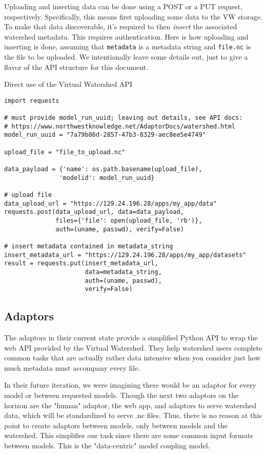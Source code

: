 \documentclass[
11pt, %
a4paper, %
oneside, %
twoside, %
headinclude,footinclude, %
BCOR5mm, %
]{scrartcl}
\begin{document}
Uploading and inserting data can be done using a POST or a PUT request, respectively. Specifically,
this means first uploading some data to the VW storage. To make that data discoverable, 
it's required to then \textit{insert} the associated watershed metadata. This
requires authentication. Here is how uploading and inserting is done, assuming that \texttt{metadata} is a 
metadata string and \texttt{file.nc} is the file to be uploaded. We intentionally leave some details out,
just to give a flavor of the API structure for this document.
\begin{listing}
    \caption{Direct use of the Virtual Watershed API}
\begin{verbatim}
import requests

# must provide model_run_uuid; leaving out details, see API docs:
# https://www.northwestknowledge.net/AdaptorDocs/watershed.html
model_run_uuid = "7a79b86d-2857-47b3-8329-aec8ee5e4749"

upload_file = "file_to_upload.nc"

data_payload = {'name': os.path.basename(upload_file),
               'modelid': model_run_uuid}

# upload file               
data_upload_url = "https://129.24.196.28/apps/my_app/data"
requests.post(data_upload_url, data=data_payload,
              files={'file': open(upload_file, 'rb')},
              auth=(uname, passwd), verify=False)

# insert metadata contained in metadata_string
insert_metadata_url = "https://129.24.196.28/apps/my_app/datasets"
result = requests.put(insert_metadata_url,
                      data=metadata_string,
                      auth=(uname, passwd),
                      verify=False)
\end{verbatim}
\label{lst:vw}
\end{listing}

\subsection{Adaptors} %
\label{sub:adaptors}

The adaptors in their current state provide a simplified Python API to wrap the web API provided
by the Virtual Watershed. They help watershed users complete common tasks that are actually rather
data intensive when you consider just how much metadata must accompany every file.

In their future iteration, we were imagining there would be an adaptor for every model or between
requested models. Though the next two adaptors on the horizon are the "human" adaptor, the web app, 
and adaptors to serve watershed data, which will be standardized to serve .nc files. Thus, there is
no reason at this point to create adaptors between models, only between models and the watershed.
This simplifies our task since there are some common input formats between models. This is 
the "data-centric" model coupling model.
\end{document}
